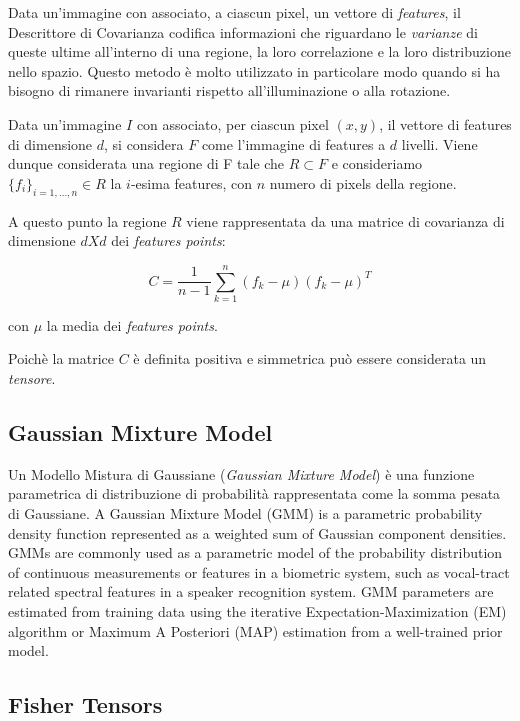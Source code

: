 Data un'immagine con associato, a ciascun pixel, un vettore di \emph{features}, il Descrittore di Covarianza codifica informazioni che riguardano le \emph{varianze} di queste ultime all'interno di una regione, la loro correlazione e la loro distribuzione nello spazio. Questo metodo è molto utilizzato in particolare modo quando si ha bisogno di rimanere invarianti rispetto all'illuminazione o alla rotazione.

Data un'immagine $I$ con associato, per ciascun pixel $(x, y)$, il vettore di features di dimensione $d$, si considera $F$ come l'immagine di features a $d$ livelli. Viene dunque considerata una regione di F tale che $R \subset F$ e consideriamo $\{f_i\}_{i = 1,\ldots, n} \in R$ la $i$-esima features, con $n$ numero di pixels della regione.

A questo punto la regione $R$ viene rappresentata da una matrice di covarianza di dimensione $d X d$ dei \emph{features points}:

$$C = \frac{1}{n -1} \sum_{k = 1}^{n} (f_k - \mu)(f_k - \mu)^T$$

con $\mu$ la media dei \emph{features points}.

Poichè la matrice $C$ è definita positiva e simmetrica può essere considerata un \emph{tensore}.

\subsection{Gaussian Mixture Model}

Un Modello Mistura di Gaussiane (\emph{Gaussian Mixture Model}) è una funzione parametrica di distribuzione di probabilità rappresentata come la somma pesata di Gaussiane.
A Gaussian Mixture Model (GMM) is a parametric probability density function represented as a weighted sum of Gaussian
component densities. GMMs are commonly used as a parametric model of the probability distribution of continuous measurements
or features in a biometric system, such as vocal-tract related spectral features in a speaker recognition system. GMM
parameters are estimated from training data using the iterative Expectation-Maximization (EM) algorithm or Maximum A
Posteriori (MAP) estimation from a well-trained prior model. 

\subsection{Fisher Tensors}




